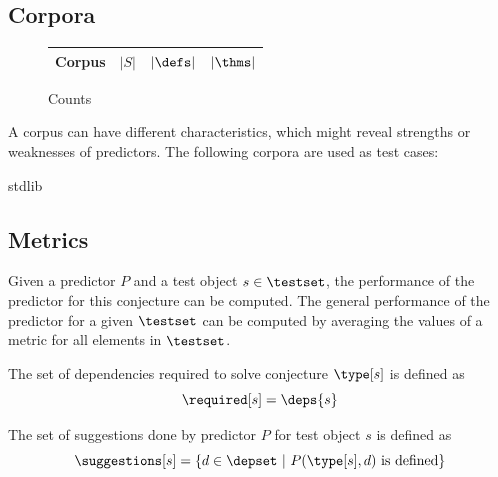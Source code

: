 
\subsection{Corpora}
\label{section:corpora}

\begin{figure}[H]
  \begin{tabular}{l|rrr}
    Corpus & $|S|$ & $|\defs|$ & $|\thms|$ \\\hline
    
  \end{tabular}
  \caption{Counts}
\end{figure}


A corpus can have different characteristics, which might reveal strengths or weaknesses of predictors.
The following corpora are used as test cases:

\begin{description}
	\item[\coq stdlib]
	\item[\compcert]
  \item[\formalin]
  \item[\corn]
  \item[\mathcomp]
\end{description}

\subsection{Metrics}
Given a predictor $P$ and a test object $s \in \testset$,
the performance of the predictor for this conjecture can be computed.
The general performance of the predictor for a given $\testset$
can be computed by averaging the values of a metric for all elements in $\testset$.

\begin{definition} The set of dependencies required to solve conjecture $\type[s]$ is defined as
  \[ \required[s] = \deps{s} \]
\end{definition}

\begin{definition} The set of suggestions done by predictor $P$ for test object $s$ is defined as
  \[ \suggestions[s] = \{ d \in \depset ~|~ P(\type[s], d) ~\text{is defined} \} \]
\end{definition}

